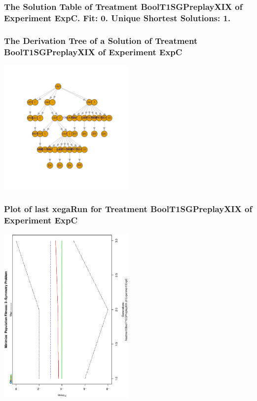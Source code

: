 \documentclass[18pt,c]{beamer}
\begin{document}
 \begin{frame}
 \fontsize{8pt}{9pt}\selectfont
 \frametitle{ The Solution Table of Treatment BoolT1SGPreplayXIX of Experiment ExpC. Fit: 0. Unique Shortest Solutions: 1. }

 \label{ExpCSolutionTable001.tex}  
 \end{frame}

 \begin{frame}
 \frametitle{ The Derivation Tree of a Solution of Treatment BoolT1SGPreplayXIX of Experiment ExpC }
 \begin{center}
\includegraphics[width=0.5\textwidth, angle=0]
{ExpCDerivationTreeFigure001.pdf}
 \end{center}
 \label{report/ExpCDerivationTreeFigure001.pdf}  
 \end{frame}

 \begin{frame}
 \frametitle{ Plot of last xegaRun for Treatment BoolT1SGPreplayXIX of Experiment ExpC }
 \begin{center}
\includegraphics[width=0.5\textwidth, angle=-90]
{ExpCPlotPopStatsFigure001.eps}
 \end{center}
 \label{report/ExpCPlotPopStatsFigure001.eps}  
 \end{frame}
\end{document}
